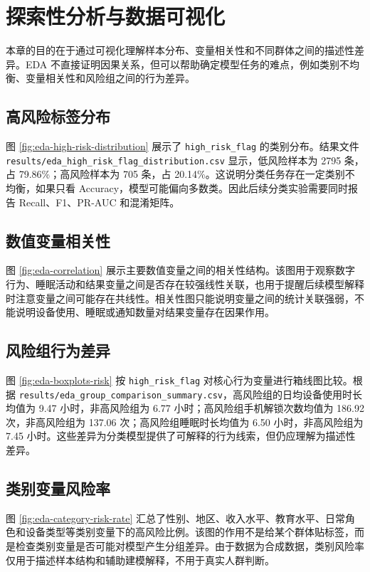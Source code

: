 \section{探索性分析与数据可视化}

本章的目的在于通过可视化理解样本分布、变量相关性和不同群体之间的描述性差异。EDA 不直接证明因果关系，但可以帮助确定模型任务的难点，例如类别不均衡、变量相关性和风险组之间的行为差异。

\subsection{高风险标签分布}

图 \ref{fig:eda-high-risk-distribution} 展示了 \texttt{high\_risk\_flag} 的类别分布。结果文件 \texttt{results/eda\_high\_risk\_flag\_distribution.csv} 显示，低风险样本为 2795 条，占 79.86\%；高风险样本为 705 条，占 20.14\%。这说明分类任务存在一定类别不均衡，如果只看 Accuracy，模型可能偏向多数类。因此后续分类实验需要同时报告 Recall、F1、PR-AUC 和混淆矩阵。


\subsection{数值变量相关性}

图 \ref{fig:eda-correlation} 展示主要数值变量之间的相关性结构。该图用于观察数字行为、睡眠活动和结果变量之间是否存在较强线性关联，也用于提醒后续模型解释时注意变量之间可能存在共线性。相关性图只能说明变量之间的统计关联强弱，不能说明设备使用、睡眠或通知数量对结果变量存在因果作用。


\subsection{风险组行为差异}

图 \ref{fig:eda-boxplots-risk} 按 \texttt{high\_risk\_flag} 对核心行为变量进行箱线图比较。根据 \texttt{results/eda\_group\_comparison\_summary.csv}，高风险组的日均设备使用时长均值为 9.47 小时，非高风险组为 6.77 小时；高风险组手机解锁次数均值为 186.92 次，非高风险组为 137.06 次；高风险组睡眠时长均值为 6.50 小时，非高风险组为 7.45 小时。这些差异为分类模型提供了可解释的行为线索，但仍应理解为描述性差异。


\subsection{类别变量风险率}

图 \ref{fig:eda-category-risk-rate} 汇总了性别、地区、收入水平、教育水平、日常角色和设备类型等类别变量下的高风险比例。该图的作用不是给某个群体贴标签，而是检查类别变量是否可能对模型产生分组差异。由于数据为合成数据，类别风险率仅用于描述样本结构和辅助建模解释，不用于真实人群判断。

